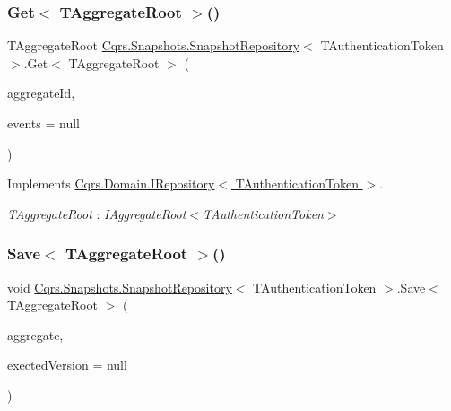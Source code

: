 \subsubsection{\texorpdfstring{Get$<$ T\+Aggregate\+Root $>$()}{Get< TAggregateRoot >()}}
{\footnotesize\ttfamily T\+Aggregate\+Root \hyperlink{classCqrs_1_1Snapshots_1_1SnapshotRepository}{Cqrs.\+Snapshots.\+Snapshot\+Repository}$<$ T\+Authentication\+Token $>$.Get$<$ T\+Aggregate\+Root $>$ (\begin{DoxyParamCaption}\item[{Guid}]{aggregate\+Id,  }\item[{I\+List$<$ \hyperlink{interfaceCqrs_1_1Events_1_1IEvent}{I\+Event}$<$ T\+Authentication\+Token $>$$>$}]{events = {\ttfamily null} }\end{DoxyParamCaption})}



Implements \hyperlink{interfaceCqrs_1_1Domain_1_1IRepository_a9a6f6fe2ae808009344f1eb8ad96f448}{Cqrs.\+Domain.\+I\+Repository$<$ T\+Authentication\+Token $>$}.

\begin{Desc}
\item[Type Constraints]\begin{description}
\item[{\em T\+Aggregate\+Root} : {\em I\+Aggregate\+Root$<$T\+Authentication\+Token$>$}]\end{description}
\end{Desc}
\mbox{\label{classCqrs_1_1Snapshots_1_1SnapshotRepository_a4a7484e7754cae876f0c04e640eb80ff}} 
\subsubsection{\texorpdfstring{Save$<$ T\+Aggregate\+Root $>$()}{Save< TAggregateRoot >()}}
{\footnotesize\ttfamily void \hyperlink{classCqrs_1_1Snapshots_1_1SnapshotRepository}{Cqrs.\+Snapshots.\+Snapshot\+Repository}$<$ T\+Authentication\+Token $>$.Save$<$ T\+Aggregate\+Root $>$ (\begin{DoxyParamCaption}\item[{T\+Aggregate\+Root}]{aggregate,  }\item[{int?}]{exected\+Version = {\ttfamily null} }\end{DoxyParamCaption})}



